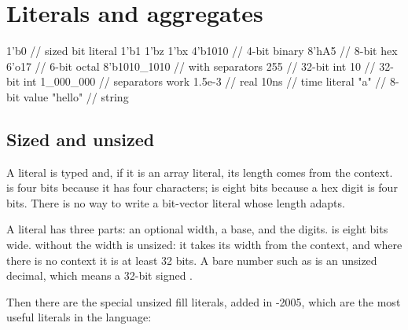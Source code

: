 \section{Literals and aggregates}
\label{sec:rosetta:literals}

\begin{rosetta}
\begin{rright}
1'b0           // sized bit literal
1'b1
1'bz
1'bx
4'b1010        // 4-bit binary
8'hA5          // 8-bit hex
6'o17          // 6-bit octal
8'b1010_1010   // with separators
255            // 32-bit int
10             // 32-bit int
1_000_000      // separators work
1.5e-3         // real
10ns           // time literal
"a"            // 8-bit value
"hello"        // string
\end{rright}
\end{rosetta}


\subsection{Sized and unsized}

A \VHDL{} literal is typed and, if it is an array literal, its length comes
from the context.  is four bits because it has four characters;
 is eight bits because a hex digit is four bits. There is no way to
write a bit-vector literal whose length adapts.

A \SV{} literal has three parts: an optional width, a base, and the digits.
 is eight bits wide.  without the width is unsized: it
takes its width from the context, and where there is no context it is at least
32 bits. A bare number such as  is an unsized decimal, which means a
32-bit signed .

Then there are the special unsized fill literals, added in \SV{}-2005, which
are the most useful literals in the language:

